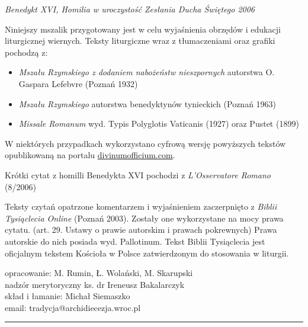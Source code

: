\documentclass[10pt,a5paper]{book}
\begin{document}
	\bigskip
	
	\hfill \textit{Benedykt XVI, Homilia  w uroczystość Zesłania Ducha Świętego 2006}
	
	\vspace*{\fill}
	
	\hrulefill
	
	{\footnotesize 
	Niniejszy mszalik przygotowany jest w celu wyjaśnienia obrzędów i edukacji liturgicznej wiernych. Teksty liturgiczne wraz z tłumaczeniami oraz grafiki pochodzą z:
	
	\begin{itemize}[leftmargin=*]
		\item \textit{Mszału Rzymskiego z dodaniem nabożeństw nieszpornych} autorstwa O. Gaspara Lefebvre (Poznań 1932)
		\item \textit{Mszału Rzymskiego} autorstwa benedyktynów tynieckich (Poznań 1963)
		\item \textit{Missale Romanum} wyd. Typis Polyglotis Vaticanis (1927) oraz Pustet (1899)
	\end{itemize}

	W niektórych przypadkach wykorzystano cyfrową wersję powyższych tekstów opublikowaną na portalu \url{divinumofficium.com}.
	
	\medskip
	
	Krótki cytat z homilli Benedykta XVI pochodzi z \textit{L'Osservatore Romano} (8/2006)
	
	\medskip
	
	Teksty czytań opatrzone komentarzem i wyjaśnieniem zaczerpnięto z \textit{Biblii Tysiąclecia Online} (Poznań 2003). Zostały one wykorzystane na mocy prawa cytatu. (art. 29. Ustawy o prawie autorskim i prawach pokrewnych) Prawa autorskie do nich posiada wyd. Pallotinum. Tekst Biblii Tysiąclecia jest oficjalnym tekstem Kościoła w Polsce zatwierdzonym do stosowania w liturgii.
	
	\bigskip
	
	opracowanie: M. Rumin, Ł. Wolański, M. Skarupski\\
	nadzór merytoryczny ks. dr Ireneusz Bakalarczyk\\
	skład i łamanie: Michał Siemaszko\\
	
	email: tradycja@archidiecezja.wroc.pl 
	}
	\hrule
	
	\newpage
	
	
\end{document}
